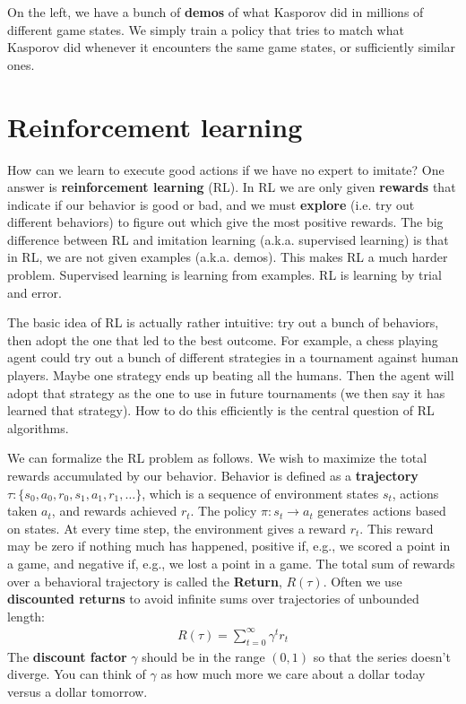 On the left, we have a bunch of {\bf demos} of what Kasporov did in millions of different game states. We simply train a policy that tries to match what Kasporov did whenever it encounters the same game states, or sufficiently similar ones.

\section{Reinforcement learning}
How can we learn to execute good actions if we have no expert to imitate? One answer is {\bf reinforcement learning} (RL). In RL we are only given {\bf rewards} that indicate if our behavior is good or bad, and we must {\bf explore} (i.e. try out different behaviors) to figure out which give the most positive rewards. The big difference between RL and imitation learning (a.k.a. supervised learning) is that in RL, we are not given examples (a.k.a. demos). This makes RL a much harder problem. Supervised learning is learning from examples. RL is learning by trial and error.

The basic idea of RL is actually rather intuitive: try out a bunch of behaviors, then adopt the one that led to the best outcome. For example, a chess playing agent could try out a bunch of different strategies in a tournament against human players. Maybe one strategy ends up beating all the humans. Then the agent will adopt that strategy as the one to use in future tournaments (we then say it has learned that strategy). How to do this efficiently is the central question of RL algorithms.

We can formalize the RL problem as follows. We wish to maximize the total rewards accumulated by our behavior. Behavior is defined as a {\bf trajectory} $\tau: \{s_0, a_0, r_0, s_1, a_1, r_1, \ldots\}$, which is a sequence of environment states $s_t$, actions taken $a_t$, and rewards achieved $r_t$. The policy $\pi: s_t \rightarrow a_t$ generates actions based on states. At every time step, the environment gives a reward $r_t$. This reward may be zero if nothing much has happened, positive if, e.g., we scored a point in a game, and negative if, e.g., we lost a point in a game.
The total sum of rewards over a behavioral trajectory is called the {\bf Return}, $R(\tau)$. Often we use {\bf discounted returns} to avoid infinite sums over trajectories of unbounded length:%
\begin{align}
    R(\tau) = \sum_{t=0}^\infty \gamma^t r_t
\end{align}
The {\bf discount factor} $\gamma$ should be in the range $(0,1)$ so that the series doesn't diverge. You can think of $\gamma$ as how much more we care about a dollar today versus a dollar tomorrow.

